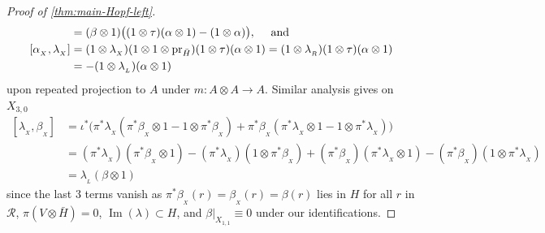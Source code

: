 \documentclass[11pt]{amsart}
\numberwithin{equation}{section}
\DeclareMathOperator{\Ima}{Im}
\newcommand{\X}{_X}
\newcommand{\alphax}{\alpha_{\X}}
\newcommand{\betax}{\beta_{\X}}
\newcommand{\lambdax}{\lambda_{\X}}
\newcommand{\pr}{ {\rm{pr}} }%
\newcommand{\R}{\mathcal{R}}
\renewcommand{\_}[1]{\mbox{$_{\left( #1 \right)}$}}
\newcommand{\ot}{\otimes}
\begin{document}
{\begin{proof}[Proof of \cref{thm:main-Hopf-left}]
$$\begin{aligned}
  &=
  (\beta\ot 1) 
\big(
(1\ot \tau)(\alpha\ot 1) -(1\ot \alpha) \big),
\quad\text{ and  }
\\
[\alphax, \lambdax]
&=
(1 \ot\lambdax) (1\ot 1\ot \pr_{\bar H}) (1\ot \tau)(\alpha\ot 1)
=
(1 \ot\lambda_{_R}) (1\ot \tau)(\alpha\ot 1)
\\ &=
-(1 \ot\lambda_{_L}) (\alpha\ot 1)
\end{aligned}
  $$
  upon repeated projection to $A$ under $m:A\ot A\rightarrow A$.
%
  Similar analysis 
  gives on $X_{3,0}$
$$
 \begin{aligned}
   [\lambdax, \betax]
  &=
   \iota^*\Big(\pi^*\lambdax (\pi^*\betax\ot 1 - 1\ot \pi^*\betax) 
   +
   \pi^*\betax (\pi^*\lambdax\ot 1 - 1\ot \pi^*\lambdax) \Big) 
\\ &=
(\pi^*\lambdax)(\pi^*\betax \ot 1) -
(\pi^*\lambdax) (1\ot \pi^*\betax) 
   +
   (\pi^*\betax) 
   (\pi^*\lambdax\ot 1) -    (\pi^*\betax)( 1\ot \pi^*\lambdax) 
   \\ &=
\lambda_{_L}(\beta \ot 1 ) 
      \, 
 \end{aligned}
 $$
 since the last 3 terms vanish 
 as $\pi^*\betax (r) = \betax(r) = \beta(r)$ lies in $H$
 for all $r$ in $\R$,
 $\pi(V\ot \bar H)= 0$, $\Ima(\lambda)\subset H$, and
 $\beta|_{X_{1,1}}\equiv 0$
 under our identifications.


\end{proof}}
\end{document}
